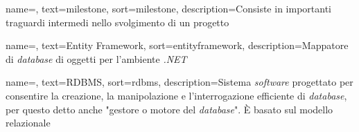 {
    name=,
    text=milestone,
    sort=milestone,
    description={Consiste in importanti traguardi intermedi nello svolgimento di un progetto}
}

{
    name=,
    text=Entity Framework,
    sort=entityframework,
    description={Mappatore di \textit{database} di oggetti per l'ambiente \textit{.NET} \cite{site:docs-ef}}
}

{
    name=,
    text=RDBMS,
    sort=rdbms,
    description={Sistema \textit{software} progettato per consentire la creazione, la manipolazione e l'interrogazione efficiente di \textit{database}, per questo detto anche "gestore o motore del \textit{database}". È basato sul modello relazionale \cite{site:wiki}}
}